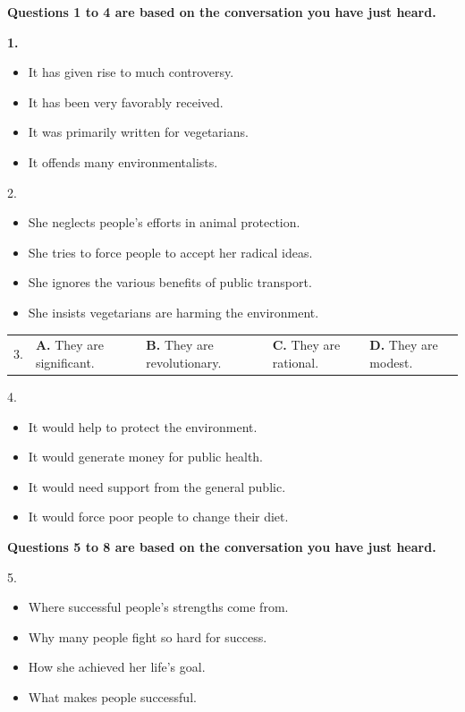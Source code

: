 \documentclass[UTF8,11pt]{ctexart}
\begin{document}
\textbf{Questions 1 to 4 are based on the conversation you have just heard.}


\textbf{1.}


\begin{itemize}[leftmargin=2em,itemsep=.2em,topsep=.4em]\item[A.] It has given rise to much controversy.
\item[B.] It has been very favorably received.
\item[C.] It was primarily written for vegetarians.
\item[D.] It offends many environmentalists.
\end{itemize}

2.


\begin{itemize}[leftmargin=2em,itemsep=.2em,topsep=.4em]\item[A.] She neglects people's efforts in animal protection.
\item[B.] She tries to force people to accept her radical ideas.
\item[C.] She ignores the various benefits of public transport.
\item[D.] She insists vegetarians are harming the environment.
\end{itemize}

\noindent\begin{tabularx}{\linewidth}{@{}lXXXX@{}}3. & \textbf{A.} They are significant. & \textbf{B.} They are revolutionary. & \textbf{C.} They are rational. & \textbf{D.} They are modest.\\\end{tabularx}\par

4.


\begin{itemize}[leftmargin=2em,itemsep=.2em,topsep=.4em]\item[A.] It would help to protect the environment.
\item[B.] It would generate money for public health.
\item[C.] It would need support from the general public.
\item[D.] It would force poor people to change their diet.
\end{itemize}

\textbf{Questions 5 to 8 are based on the conversation you have just heard.}


5.


\begin{itemize}[leftmargin=2em,itemsep=.2em,topsep=.4em]\item[A.] Where successful people's strengths come from.
\item[B.] Why many people fight so hard for success.
\item[C.] How she achieved her life's goal.
\item[D.] What makes people successful.
\end{itemize}
\end{document}
